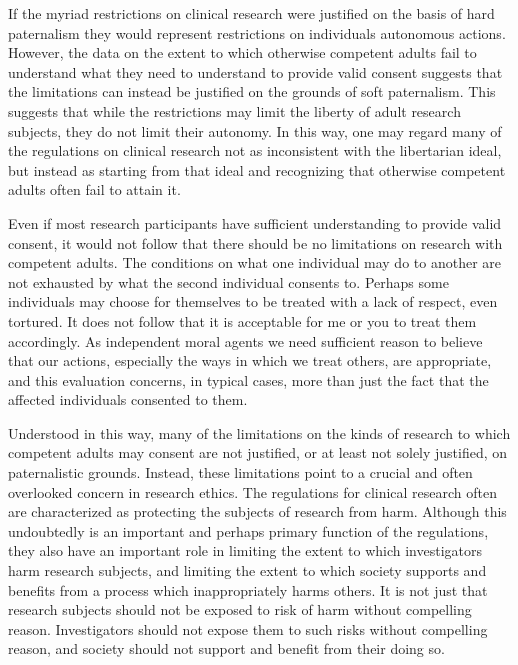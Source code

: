 \documentclass[12p]{article}
\begin{document}
If the myriad restrictions on clinical research were justified on the basis of hard paternalism they would represent restrictions on individuals autonomous actions. However, the data on the extent to which otherwise competent adults fail to understand what they need to understand to provide valid consent suggests that the limitations can instead be justified on the grounds of soft paternalism. This suggests that while the restrictions may limit the liberty of adult research subjects, they do not limit their autonomy. In this way, one may regard many of the regulations on clinical research not as inconsistent with the libertarian ideal, but instead as starting from that ideal and recognizing that otherwise competent adults often fail to attain it.

Even if most research participants have sufficient understanding to provide valid consent, it would not follow that there should be no limitations on research with competent adults. The conditions on what one individual may do to another are not exhausted by what the second individual consents to. Perhaps some individuals may choose for themselves to be treated with a lack of respect, even tortured. It does not follow that it is acceptable for me or you to treat them accordingly. As independent moral agents we need sufficient reason to believe that our actions, especially the ways in which we treat others, are appropriate, and this evaluation concerns, in typical cases, more than just the fact that the affected individuals consented to them.

Understood in this way, many of the limitations on the kinds of research to which competent adults may consent are not justified, or at least not solely justified, on paternalistic grounds. Instead, these limitations point to a crucial and often overlooked concern in research ethics. The regulations for clinical research often are characterized as protecting the subjects of research from harm. Although this undoubtedly is an important and perhaps primary function of the regulations, they also have an important role in limiting the extent to which investigators harm research subjects, and limiting the extent to which society supports and benefits from a process which inappropriately harms others. It is not just that research subjects should not be exposed to risk of harm without compelling reason. Investigators should not expose them to such risks without compelling reason, and society should not support and benefit from their doing so.
\end{document}
